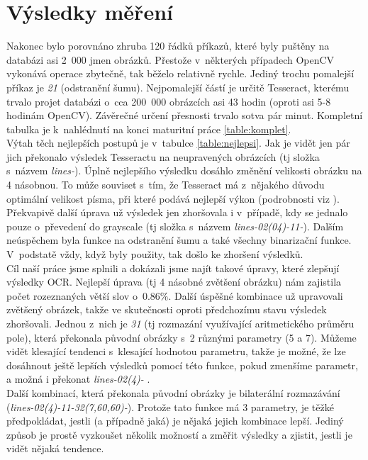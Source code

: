 \documentclass[12pt]{report}			%
\begin{document}
\chapter{Výsledky měření}
	Nakonec bylo porovnáno zhruba 120 řádků příkazů, které byly puštěny na databázi asi 2~000 jmen obrázků. Přestože v~některých případech OpenCV vykonává operace zbytečně, tak běželo relativně rychle. Jediný trochu pomalejší příkaz je \emph{21} (odstranění šumu). Nejpomalejší částí je určitě Tesseract, kterému trvalo projet databázi o~cca 200~000 obrázcích asi 43 hodin (oproti asi 5-8 hodinám OpenCV). Závěrečné určení přesnosti trvalo sotva pár minut. Kompletní tabulka je k~nahlédnutí na konci maturitní práce \ref{table:komplet}.\\ 
	Výtah těch nejlepších postupů je v~tabulce \ref{table:nejlepsi}. Jak je vidět jen pár jich překonalo výsledek Tesseractu na neupravených obrázcích (\gls{tj} složka s~názvem \emph{lines-}). Úplně nejlepšího výsledku dosáhlo změnění velikosti obrázku na 4 násobnou. To může souviset s~tím, že Tesseract má z~nějakého důvodu optimální velikost písma, při které podává nejlepší výkon (podrobnosti  \gls{viz} \parencite{tess_weird}). Překvapivě další úprava už výsledek jen zhoršovala i v~případě, kdy se jednalo pouze o~převedení do grayscale (\gls{tj} složka s~názvem \emph{lines-02(04)-11-}). Dalším neúspěchem byla funkce na odstranění šumu a také všechny binarizační funkce. V~podstatě vždy, když byly použity, tak došlo ke zhoršení výsledků.\\ 
	Cíl naší práce jsme splnili a dokázali jsme najít takové úpravy, které zlepšují výsledky \gls{OCR}. Nejlepší úprava (\gls{tj} 4 násobné zvětšení obrázku) nám zajistila počet rozeznaných větší slov o~$0.86\%$. Další úspěšné kombinace už upravovali zvětšený obrázek, takže ve skutečnosti oproti předchozímu stavu výsledek zhoršovali. Jednou z~nich je \emph{31} (\gls{tj} rozmazání využívající aritmetického průměru pole), která překonala původní obrázky s~2 různými parametry (5 a 7). Můžeme vidět klesající tendenci s~klesající hodnotou parametru, takže je možné, že lze dosáhnout ještě lepších výsledků pomocí této funkce, pokud zmenšíme parametr, a možná i překonat \emph{lines-02(4)- }.\\
	Další kombinací, která překonala původní obrázky je bilaterální rozmazávání (\emph{lines-02(4)-11-32(7,60,60)-}). Protože tato funkce má 3 parametry, je těžké předpokládat, jestli (a případně jaká) je nějaká jejich kombinace lepší. Jediný způsob je prostě vyzkoušet několik možností a změřit výsledky a zjistit, jestli je vidět nějaká tendence.\\
\end{document}

